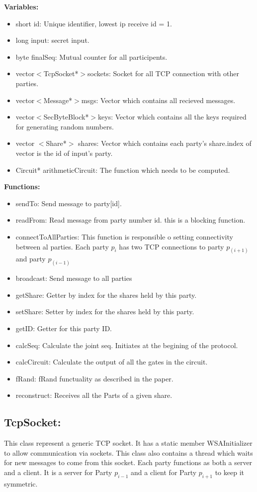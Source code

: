 \documentclass[12pt]{article}
\begin{document}
\textbf{Variables:}
\begin{itemize}
	\item short id: Unique identifier, lowest ip receive id = 1. 
	\item long input: secret input.
	\item byte finalSeq: Mutual counter for all participents.
	\item vector$<$TcpSocket*$>$sockets: Socket for all TCP connection with other parties.
	\item vector$<$Message*$>$msgs: Vector which contains all recieved messages.
	\item vector$<$SecByteBlock*$>$keys: Vector which contains all the keys required for generating random numbers.
	\item vector $<$Share*$>$ shares: Vector which contains each party's share.index of vector is the id of input's party.
	\item Circuit* arithmeticCircuit: The function which needs to be computed.
\end{itemize}
\textbf{Functions:}
\begin{itemize}
	\item sendTo: Send message to party[id].
	\item readFrom: Read message from party number id. this is a blocking function.
	\item connectToAllParties: This function is responsible o setting connectivity between al parties. Each party $p_i$ has two TCP connections to party $p_{(i+1)}$ and party $p_{(i-1)}$ 
	\item broadcast: Send message to all parties
	\item getShare: Getter by index for the shares held by this party.
	\item setShare: Setter by index for the shares held by this party.
	\item getID: Getter for this party ID.
	\item calcSeq: Calculate the joint seq. Initiates at the begining of the protocol.
	\item calcCircuit: Calculate the output of all the gates in the circuit.
	\item fRand: fRand functuality as described in the paper.
	\item reconstruct: Receives all the Parts of a given share.
\end{itemize}


\subsection{TcpSocket:}
This class represent a generic TCP socket. It has a static member WSAInitializer to allow communication via sockets. This class also contains a thread which waits for new messages to come from this socket. Each party functions as both a server and a client. It is a server for Party $p_{i-1}$ and a client for Party $p_{i+1}$ to keep it symmetric. 
\hfill\break
\end{document}
